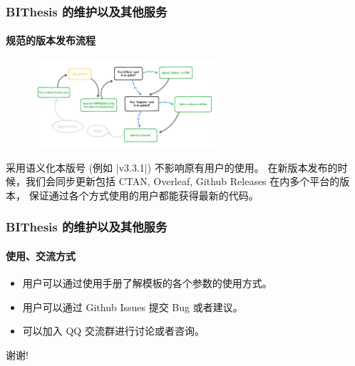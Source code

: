 \documentclass[
  aspectratio=169,
  presentation,
  titlegraphic=./images/bit.png,
  framelogo=./images/bit.png
]{bitbeamer}
\begin{document}
\begin{frame}[c]
  \frametitle{BIThesis 的维护以及其他服务}
  \framesubtitle{规范的版本发布流程}

\begin{figure}
  \begin{center}
    \includegraphics[width=0.6\textwidth]{images/release_workflow.png}
  \end{center}
\end{figure}

采用语义化本版号 (例如 |v3.3.1|) 不影响原有用户的使用。
在新版本发布的时候，我们会同步更新包括 CTAN, Overleaf, Github Releases 在内多个平台的版本，
保证通过各个方式使用的用户都能获得最新的代码。

\end{frame}

\begin{frame}[c]
  \frametitle{BIThesis 的维护以及其他服务}
  \framesubtitle{使用、交流方式}

  \begin{itemize}
    \item 用户可以通过使用手册了解模板的各个参数的使用方式。
    \item 用户可以通过 Github Issues 提交 Bug 或者建议。
    \item 可以加入 QQ 交流群进行讨论或者咨询。
  \end{itemize}
\end{frame}


\begin{frame}[c]

  谢谢!
  
\end{frame}
\end{document}
